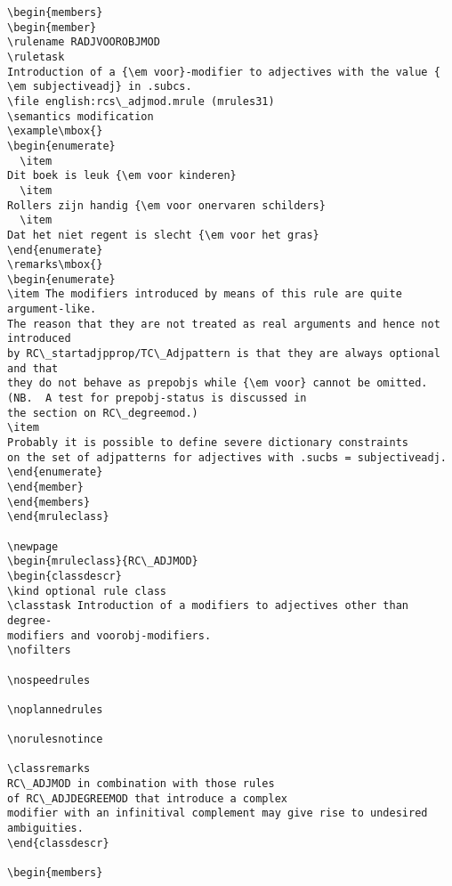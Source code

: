 \begin{verbatim}
\begin{members}
\begin{member}
\rulename RADJVOOROBJMOD
\ruletask 
Introduction of a {\em voor}-modifier to adjectives with the value {
\em subjectiveadj} in .subcs. 
\file english:rcs\_adjmod.mrule (mrules31)
\semantics modification 
\example\mbox{}
\begin{enumerate}
  \item 
Dit boek is leuk {\em voor kinderen}
  \item
Rollers zijn handig {\em voor onervaren schilders}
  \item
Dat het niet regent is slecht {\em voor het gras}
\end{enumerate}
\remarks\mbox{}
\begin{enumerate}
\item The modifiers introduced by means of this rule are quite argument-like.
The reason that they are not treated as real arguments and hence not introduced
by RC\_startadjpprop/TC\_Adjpattern is that they are always optional and that 
they do not behave as prepobjs while {\em voor} cannot be omitted.
(NB.  A test for prepobj-status is discussed in 
the section on RC\_degreemod.)
\item
Probably it is possible to define severe dictionary constraints
on the set of adjpatterns for adjectives with .sucbs = subjectiveadj.
\end{enumerate}
\end{member}
\end{members}
\end{mruleclass}

\newpage
\begin{mruleclass}{RC\_ADJMOD}
\begin{classdescr}
\kind optional rule class
\classtask Introduction of a modifiers to adjectives other than degree-
modifiers and voorobj-modifiers.
\nofilters

\nospeedrules

\noplannedrules

\norulesnotince

\classremarks
RC\_ADJMOD in combination with those rules 
of RC\_ADJDEGREEMOD that introduce a complex
modifier with an infinitival complement may give rise to undesired ambiguities.
\end{classdescr}

\begin{members}


\end{verbatim}
